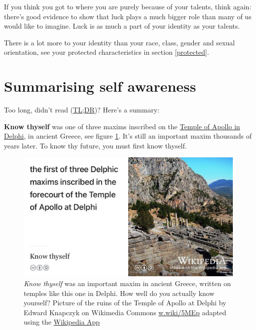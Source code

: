 \documentclass[
]{book}
\begin{document}
If you think you got to where you are purely because of your talents, think again: there's good evidence to show that luck plays a much bigger role than many of us would like to imagine. \citep{luckynottalented} Luck is as much a part of your identity as your talents.

There is a lot more to your identity than your race, class, gender and sexual orientation, see your protected characteristics in section \ref{protected}.

\hypertarget{tldr2}{%
\section{Summarising self awareness}\label{tldr2}}

Too long, didn't read (\href{https://en.wiktionary.org/wiki/too_long;_didn\%27t_read}{TL;DR})? Here's a summary:

\textbf{Know thyself} was one of three maxims inscribed on the \href{https://en.wikipedia.org/wiki/Temple_of_Apollo_(Delphi)}{Temple of Apollo in Delphi}, in ancient Greece, see figure \ref{fig:delphi-fig}. It's still an important maxim thousands of years later. To know thy future, you must first know thyself.

\begin{figure}

{\centering \includegraphics[width=1\linewidth]{images/know-thyself-delphi} 

}

\caption{\emph{Know thyself} was an important maxim in ancient Greece, written on temples like this one in Delphi. How well do you actually know yourself? Picture of the ruins of the Temple of Apollo at Delphi by Edward Knapczyk on Wikimedia Commons \href{https://w.wiki/5MEp}{w.wiki/5MEp} adapted using the \href{https://apps.apple.com/gb/app/wikipedia/id324715238}{Wikipedia App}}\label{fig:delphi-fig}
\end{figure}
\end{document}
